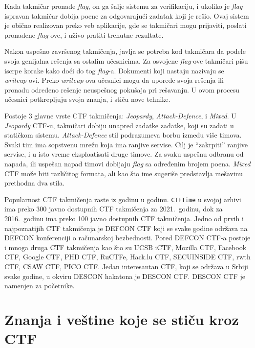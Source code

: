 \documentclass[12pt, a4paper, twocolumn]{article}
\begin{document}
Kada takmičar pronađe \emph{flag}, on ga šalje sistemu za verifikaciju, 
i ukoliko je \emph{flag} ispravan takmičar dobija poene za odgovarajući 
zadatak koji je rešio. Ovaj sistem je obično realizovan preko veb aplikacije, 
gde se takmičari mogu prijaviti, poslati pronađene \emph{flag}-ove, i uživo 
pratiti trenutne rezultate.

Nakon uspešno završenog takmičenja, javlja se potreba kod takmičara da podele
svoja genijalna rešenja sa ostalim učesnicima. Za osvojene \emph{flag}-ove
takmičari pišu iscrpe korake kako doći do tog \emph{flag}-a. Dokumenti koji 
nastaju nazivaju se \emph{writeup}-ovi. Preko \emph{writeup}-ova učesnici mogu 
da uporede svoja rešenja ili pronađu određeno rešenje neuspešnog pokušaja 
pri rešavanju. U ovom procesu učesnici potkrepljuju svoja znanja, 
i stiču nove tehnike.

Postoje 3 glavne vrste CTF takmičenja: \emph{Jeopardy}, \emph{Attack-Defence},
i \emph{Mixed}. \cite{ctf_time} U \emph{Jeopardy} CTF-u, takmičari dobiju 
unapred zadatke zadatke, koji su zadati u statičkom sistemu.
\emph{Attack-Defence} stil podrazumeva borbu između više timova. Svaki tim
ima sopstvenu mrežu koja ima ranjive servise. Cilj je ``zakrpiti'' ranjive
servise, i u isto vreme eksploatisati druge timove. Za svaku uspešnu odbranu 
od napada, ili uspešan napad timovi dobijaju \emph{flag} sa određenim brojem 
poena. \emph{Mixed} CTF može biti različitog formata, ali kao što ime sugeriše 
predstavlja mešavinu prethodna dva stila.

Popularnost CTF takmičenja raste iz godinu u godinu. \texttt{CTFTime} u
svojoj arhivi ima preko 300 javno dostupnih CTF takmičenja za 2021.\ godinu,
dok za 2016.\ godinu ima preko 100 javno dostupnih CTF takmičenja.
\cite{ctf_time} Jedno od prvih i najpoznatijih CTF takmičenja je DEFCON CTF
koji se svake godine održava na DEFCON konferenciji o računarskoj bezbednosti. 
\cite{ctf_defcon} Pored DEFCON CTF-a postoje i mnoga druga CTF takmičenja kao 
što su UCSB iCTF, Mozilla CTF, Facebook CTF, Google CTF, PHD CTF, RuCTFe, 
Hack.lu CTF, SECUINSIDE CTF, rwth CTF, CSAW CTF, PICO CTF. \cite{ctf_rank} 
Jedan interesantan CTF, koji se održava u Srbiji svake godine, u okviru 
DESCON hakatona je DESCON CTF. \cite{ctf_descon} DESCON CTF je namenjen 
za početnike.

\section{Znanja i veštine koje se stiču kroz CTF}
\end{document}

